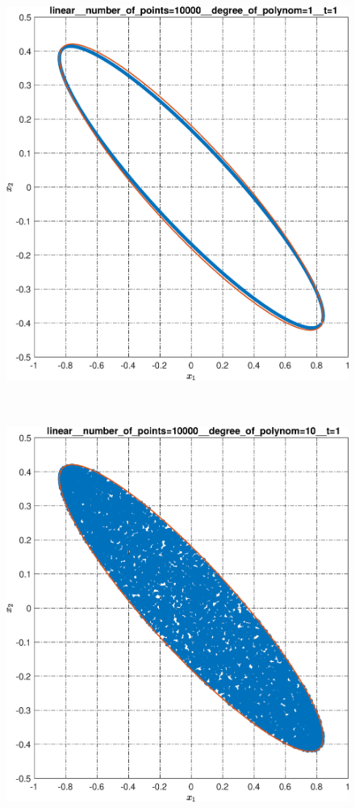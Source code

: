 \documentclass[../main.tex]{subfiles}
\begin{document}
\begin{figure}[ht!]
\begin{minipage}[b]{.3\linewidth}
 		\includegraphics[width=\linewidth]{images/linear__number_of_points=10000__degree_of_polynom=1__t=1.eps}
 		 \label{fig:ap:linearN104k1T1} 
 	\end{minipage} 
 	\hfill
 	\begin{minipage}[b]{.3\linewidth} 
 		\small
 		\centering
 		\includegraphics[width=\linewidth]{images/linear__number_of_points=10000__degree_of_polynom=10__t=1.eps}

\end{minipage}
\end{figure}
\end{document}
